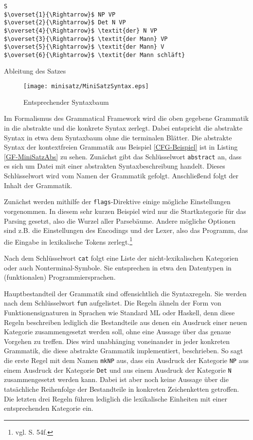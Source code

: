 \documentclass[12pt,abstract=on,titlepage,bibliography=totoc,ngerman,listof=totoc]{scrreprt}
\begin{document}
\begin{program}[h]
\begin{Verbatim}[commandchars=\\\{\},codes={\catcode`$=3\catcode`^=7}] 
S
$\overset{1}{\Rightarrow}$ NP VP
$\overset{2}{\Rightarrow}$ Det N VP
$\overset{4}{\Rightarrow}$ \textit{der} N VP
$\overset{3}{\Rightarrow}$ \textit{der Mann} VP
$\overset{5}{\Rightarrow}$ \textit{der Mann} V
$\overset{6}{\Rightarrow}$ \textit{der Mann schläft}
\end{Verbatim}
\caption{Ableitung des Satzes}
\label{CFG-Ableitung}
\end{program}
\begin{figure}[h]
\texttt{[image: minisatz/MiniSatzSyntax.eps]}
\caption{Entsprechender Syntaxbaum}\label{CFG-Syntaxbaum}
\end{figure}
Im Formalismus des Grammatical Framework wird die oben gegebene Grammatik in die abstrakte und die konkrete Syntax zerlegt.
Dabei entspricht die abstrakte Syntax in etwa dem Syntaxbaum ohne die terminalen Blätter. Die abstrakte Syntax der kontextfreien Grammatik aus Beispiel \ref{CFG-Beispiel} ist in Listing \ref{GF-MiniSatzAbs} zu sehen. Zunächst gibt das Schlüsselwort \texttt{abstract} an, dass es sich um Datei mit einer abstrakten Syntaxbeschreibung handelt. Dieses Schlüsselwort wird vom Namen der Grammatik gefolgt. Anschließend folgt der Inhalt der Grammatik. \par
Zunächst werden mithilfe der \texttt{flags}-Direktive einige mögliche Einstellungen vorgenommen. In diesem sehr kurzen Beispiel wird nur die Startkategorie für das Parsing gesetzt, also die Wurzel aller Parsebäume. Andere mögliche Optionen sind z.B. die Einstellungen des Encodings und der Lexer, also das Programm, das die Eingabe in lexikalische Tokens zerlegt.\footnote{vgl. \cite{RANTA2011} S. 54f.} \par
Nach dem Schlüsselwort \texttt{cat} folgt eine Liste der nicht-lexikalischen Kategorien oder auch Nonterminal-Symbole. Sie entsprechen in etwa den Datentypen in (funktionalen) Programmiersprachen. \par
Hauptbestandteil der Grammatik sind offensichtlich die Syntaxregeln. Sie werden nach dem Schlüsselwort \texttt{fun} aufgelistet. Die Regeln ähneln der Form von Funktionensignaturen in Sprachen wie Standard ML oder Haskell, denn diese Regeln beschreiben lediglich die Bestandteile aus denen ein Ausdruck einer neuen Kategorie zusammengesetzt werden soll, ohne eine Aussage über das genaue Vorgehen zu treffen. Dies wird unabhänging voneinander in jeder konkreten Grammatik, die diese abstrakte Grammatik implementiert, beschrieben. So sagt die erste Regel mit dem Namen \texttt{mkNP} aus, dass ein Ausdruck der Kategorie \texttt{NP} aus einem Ausdruck der Kategorie \texttt{Det} und aus einem Ausdruck der Kategorie \texttt{N} zusammengesetzt werden kann. Dabei ist aber noch keine Aussage über die tatsächliche Reihenfolge der Bestandteile in konkreten Zeichenketten getroffen. Die letzten drei Regeln führen lediglich die lexikalische Einheiten mit einer entsprechenden Kategorie ein. \par
\end{document}
